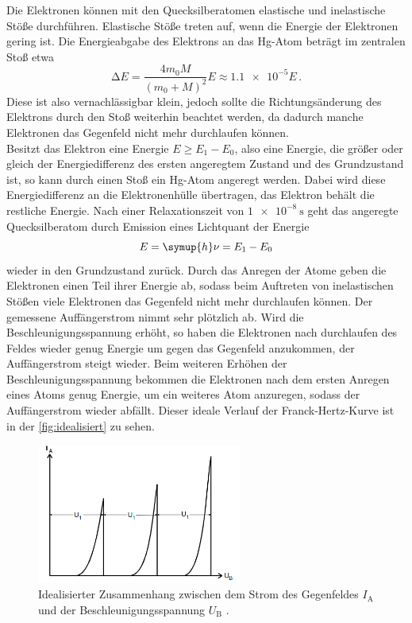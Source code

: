     \noindent Die Elektronen können mit den Quecksilberatomen elastische und inelastische Stöße durchführen. Elastische Stöße treten auf, wenn die Energie der Elektronen 
    gering ist. Die Energieabgabe des Elektrons an das Hg-Atom beträgt im zentralen Stoß etwa
    \begin{equation*}
        \increment E = \frac{4 m_0 M}{(m_0 + M)^2}E \approx \num{1.1e-5}E \, . 
    \end{equation*}
    Diese ist also vernachlässigbar klein, jedoch sollte die Richtungsänderung des Elektrons durch den Stoß weiterhin beachtet werden, da dadurch manche Elektronen das 
    Gegenfeld nicht mehr durchlaufen können. \\
    Besitzt das Elektron eine Energie $E \geq E_1 - E_0 $, also eine Energie, die größer oder gleich der Energiedifferenz des ersten angeregtem Zustand und des Grundzustand 
    ist, so kann durch einen Stoß ein Hg-Atom angeregt werden. Dabei wird diese Energiedifferenz an die Elektronenhülle übertragen, das Elektron behält die restliche
    Energie. Nach einer Relaxationszeit von $\SI{1e-8}{\second}$ geht das angeregte Quecksilberatom durch Emission eines Lichtquant der Energie 
    \begin{equation}\label{eqn:lambda}
        E = \symup{h} \nu = E_1 - E_0
    \end{equation}
    wieder in den Grundzustand zurück. Durch das Anregen der Atome geben die Elektronen einen Teil ihrer Energie ab, sodass beim Auftreten von inelastischen Stößen viele Elektronen
    das Gegenfeld nicht mehr durchlaufen können. Der gemessene Auffängerstrom nimmt sehr plötzlich ab. Wird die Beschleunigungsspannung erhöht, so haben die Elektronen nach durchlaufen
    des Feldes wieder genug Energie um gegen das Gegenfeld anzukommen, der Auffängerstrom steigt wieder. Beim weiteren Erhöhen der Beschleunigungsspannung bekommen die Elektronen 
    nach dem ersten Anregen eines Atoms genug Energie, um ein weiteres Atom anzuregen, sodass der Auffängerstrom wieder abfällt. Dieser ideale Verlauf der Franck-Hertz-Kurve ist in 
    der \autoref{fig:idealisiert} zu sehen. 

    \begin{figure}[H]
        \centering 
        \includegraphics[width=0.6\textwidth]{bilder/idealer_Ub_Ia.png}
        \caption{Idealisierter Zusammenhang zwischen dem Strom des Gegenfeldes $I_{\text{A}}$ und der Beschleunigungsspannung $U_{\text{B}}$ \cite{anleitung}. }
        \label{fig:idealisiert}
    \end{figure}

